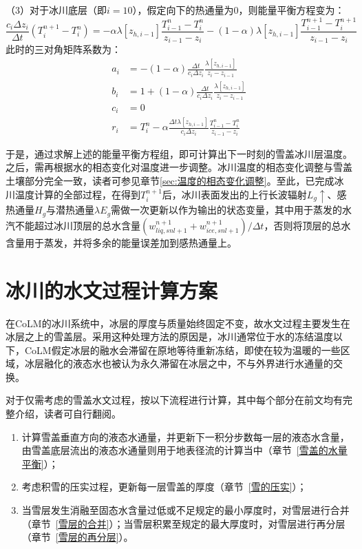 （3）对于冰川底层（即$i=10$），假定向下的热通量为0，则能量平衡方程变为：
\begin{equation}
    \frac{c_{i} \Delta z_{i}}{\Delta t}\left(T_{i}^{n+1}-T_{i}^{n}\right)=-\alpha \lambda\left[z_{h, i-1}\right] \frac{T_{i-1}^{n}-T_{i}^{n}}{z_{i-1}-z_{i}}-(1-\alpha) \lambda\left[z_{h, i-1}\right] \frac{T_{i-1}^{n+1}-T_{i}^{n+1}}{z_{i-1}-z_{i}}
\end{equation}
此时的三对角矩阵系数为：
\begin{equation}
\begin{aligned}
a_{i} &= -(1-\alpha) \frac{\Delta t}{c_{i} \Delta z_{i}} \frac{\lambda\left[z_{h, i-1}\right]}{z_{i}-z_{i-1}} \\
b_{i} &= 1+(1-\alpha) \frac{\Delta t}{c_{i} \Delta z_{i}} \frac{\lambda\left[z_{h, i-1}\right]}{z_{i}-z_{i-1}} \\
c_{i} &= 0 \\
r_{i} &= T_{i}^{n}-\alpha \frac{\Delta t \lambda\left[z_{h, i-1}\right]}{c_{i} \Delta z_{i}} \frac{T_{i-1}^{n}-T_{i}^{n}}{z_{i-1}-z_{i}}
\end{aligned}
\end{equation}

于是，通过求解上述的能量平衡方程组，即可计算出下一时刻的雪盖冰川层温度。之后，需再根据水的相态变化对温度进一步调整。冰川温度的相态变化调整与雪盖土壤部分完全一致，读者可参见章节\ref{sec:温度的相态变化调整}。至此，已完成冰川温度计算的全部过程，在得到$T^{n+1}_i$后，冰川表面发出的上行长波辐射$L_g\uparrow$、感热通量$H_g$与潜热通量$\lambda E_g$需做一次更新以作为输出的状态变量，其中用于蒸发的水汽不能超过冰川顶层的总水含量$\left(w^{n+1}_{liq,snl+1}+w^{n+1}_{ice,snl+1}\right)/\Delta t$，否则将顶层的总水含量用于蒸发，并将多余的能量误差加到感热通量上。


\section{冰川的水文过程计算方案}
在CoLM的冰川系统中，冰层的厚度与质量始终固定不变，故水文过程主要发生在冰层之上的雪盖层。采用这种处理方法的原因是，冰川通常位于水的冻结温度以下，CoLM假定冰层的融水会滞留在原地等待重新冻结，即使在较为温暖的一些区域，冰层融化的液态水也被认为永久滞留在冰层之中，不与外界进行水通量的交换。

对于仅需考虑的雪盖水文过程，按以下流程进行计算，其中每个部分在前文均有完整介绍，读者可自行翻阅。
\begin{enumerate}
    \item 计算雪盖垂直方向的液态水通量，并更新下一积分步数每一层的液态水含量，由雪盖底层流出的液态水通量则用于地表径流的计算当中（章节~\ref{雪盖的水量平衡}）；
    \item 考虑积雪的压实过程，更新每一层雪盖的厚度（章节~\ref{雪的压实}）；
    \item 当雪层发生消融至固态水含量过低或不足规定的最小厚度时，对雪层进行合并（章节~\ref{雪层的合并}）；当雪层积累至规定的最大厚度时，对雪层进行再分层（章节~\ref{雪层的再分层}）。
\end{enumerate}


